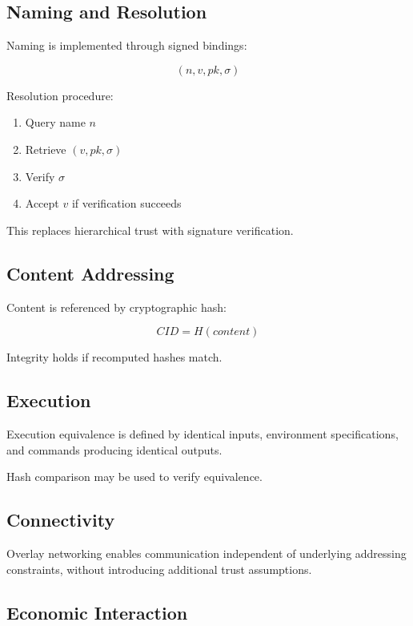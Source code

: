 \documentclass[11pt,a4paper]{article}
\begin{document}
\subsection{Naming and Resolution}

Naming is implemented through signed bindings:

\begin{equation}
(n, v, pk, \sigma)
\end{equation}

Resolution procedure:

\begin{enumerate}
\item Query name $n$
\item Retrieve $(v, pk, \sigma)$
\item Verify $\sigma$
\item Accept $v$ if verification succeeds
\end{enumerate}

This replaces hierarchical trust with signature verification.

\subsection{Content Addressing}

Content is referenced by cryptographic hash:

\begin{equation}
CID = H(content)
\end{equation}

Integrity holds if recomputed hashes match.

\subsection{Execution}

Execution equivalence is defined by identical inputs, environment specifications, and commands producing identical outputs.

Hash comparison may be used to verify equivalence.

\subsection{Connectivity}

Overlay networking enables communication independent of underlying addressing constraints, without introducing additional trust assumptions.

\subsection{Economic Interaction}
\end{document}

